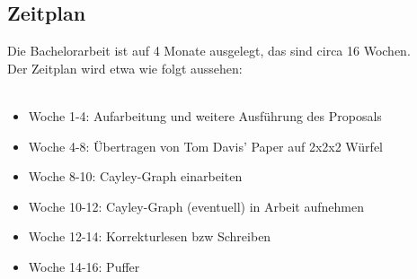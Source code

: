 \documentclass[12pt,a4paper, usenames, dvipsnames]{scrartcl}
\begin{document}
\newpage














\subsection*{Zeitplan}

Die Bachelorarbeit ist auf 4 Monate ausgelegt, das sind circa 16 Wochen. \\
Der Zeitplan wird etwa wie folgt aussehen: \\
\\
\begin{itemize}
\item Woche 1-4: Aufarbeitung und weitere Ausführung des Proposals
\item Woche 4-8: Übertragen von Tom Davis' Paper auf 2x2x2 Würfel
\item Woche 8-10: Cayley-Graph einarbeiten
\item Woche 10-12: Cayley-Graph (eventuell) in Arbeit aufnehmen
\item Woche 12-14: Korrekturlesen bzw Schreiben
\item Woche 14-16: Puffer
\end{itemize}


\newpage






\end{document}
